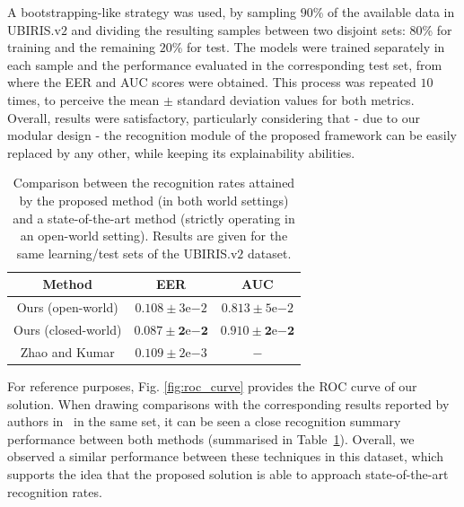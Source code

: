 A bootstrapping-like strategy was used, by sampling $90$\% of the available data in UBIRIS.v$2$ and dividing the resulting samples between two disjoint sets: $80$\% for training and the remaining $20$\% for test. The models were trained separately in each sample and the performance evaluated in the corresponding test set, from where the \ac{EER} and \ac{AUC} scores were obtained. This process was repeated $10$ times, to perceive the mean $\pm$ standard deviation values for both metrics. Overall, results were satisfactory, particularly considering that - due to our modular design - the recognition module of the proposed framework can be easily replaced by any other, while keeping its explainability abilities.\\

\begin{table}[!h]
\small
{\renewcommand{\arraystretch}{1.5}%
\begin{center}
 \begin{tabular}{|c | c | c|} 
 \hline
 \textbf{Method} & \textbf{\ac{EER}} & \textbf{\ac{AUC}} \\
 \hline
 \hline
 Ours (open-world) & $0.108 \pm 3\mathrm{e}{-2}$ & $0.813 \pm 5\mathrm{e}{-2}$ \\
 Ours (closed-world) & $\mathbf{0.087 \pm 2\mathrm{e}{-2}}$ & $\mathbf{0.910 \pm 2\mathrm{e}{-2}}$ \\
 Zhao and Kumar \cite{accurate_periocular_recognition} & $0.109 \pm 2\mathrm{e}{-3}$ & $-$ \\[1.5pt]
 \hline
\end{tabular}
\end{center}}
\caption{Comparison between the recognition rates attained by the proposed method (in both world settings) and a state-of-the-art method (strictly operating in an open-world setting). Results are given for the same learning/test sets of the UBIRIS.v$2$ dataset.}
\label{tab:quantitative_evaluation}
\end{table}

For reference purposes, Fig. \ref{fig:roc_curve} provides the \ac{ROC} curve of our solution. When drawing comparisons with the corresponding results reported by authors in~\cite{accurate_periocular_recognition} in the same set, it can be seen a close recognition summary performance between both methods (summarised in Table~\ref{tab:quantitative_evaluation}). Overall, we observed a similar performance between these techniques in this dataset, which supports the idea that the proposed solution is able to approach state-of-the-art recognition rates.

